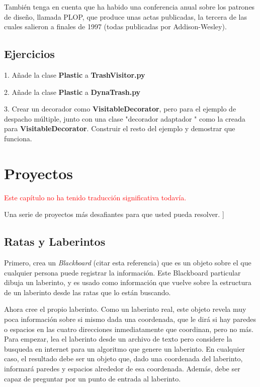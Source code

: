 \documentclass{article}
\begin{document}
También tenga en cuenta que ha habido una conferencia anual sobre los patrones de diseño, llamada PLOP, que produce unas actas publicadas, la tercera de las cuales salieron a finales de 1997 (todas publicadas por Addison-Wesley).   \newline

\subsection{Ejercicios}

1. Añade la clase \textbf{Plastic} a \textbf{TrashVisitor.py}   \newline

2. Añade la clase \textbf{Plastic} a \textbf{DynaTrash.py}   \newline

3. Crear un decorador como \textbf{VisitableDecorator}, pero para el ejemplo de despacho múltiple, junto con una clase "decorador adaptador " como la creada para \textbf{VisitableDecorator}. Construir el resto del ejemplo y demostrar que funciona. \newline


\section{Proyectos}

\textcolor{red}{Este capítulo no ha tenido traducción significativa todavía.}    \newline%

Una serie de proyectos más desafiantes para que usted pueda resolver. \newline
[[Algunos de estos pueden convertirse en ejemplos en el libro, por lo que en algún momento podría desaparecer de aquí]]

\subsection{ Ratas y Laberintos}

Primero, crea un \textit{Blackboard }\newline(citar esta referencia) que es un objeto sobre el que cualquier persona puede registrar la información. Este Blackboard particular  dibuja un laberinto, y es usado como información que vuelve sobre la estructura de un laberinto desde  las ratas que lo están  buscando. \newline

Ahora cree el propio laberinto. Como un laberinto real, este objeto revela muy poca información sobre si mismo \-dada una coordenada, que le dirá si hay paredes o espacios en las cuatro direcciones  inmediatamente que coordinan, pero no más.  Para empezar, lea el laberinto desde un archivo de texto pero considere la busqueda en internet para un algoritmo que genere un laberinto. En cualquier caso, el resultado debe ser un objeto que, dado una coordenada del laberinto, informará paredes y espacios alrededor de esa coordenada. Además, debe ser capaz de preguntar por un punto de entrada al laberinto.  \newline
\end{document}
